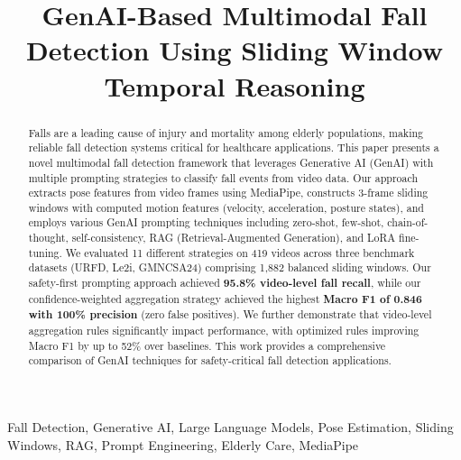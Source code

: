 \documentclass[conference]{IEEEtran}
\begin{document}
\title{GenAI-Based Multimodal Fall Detection Using Sliding Window Temporal Reasoning}

\author{
}

\maketitle

\begin{abstract}
Falls are a leading cause of injury and mortality among elderly populations, making reliable fall detection systems critical for healthcare applications. This paper presents a novel multimodal fall detection framework that leverages Generative AI (GenAI) with multiple prompting strategies to classify fall events from video data. Our approach extracts pose features from video frames using MediaPipe, constructs 3-frame sliding windows with computed motion features (velocity, acceleration, posture states), and employs various GenAI prompting techniques including zero-shot, few-shot, chain-of-thought, self-consistency, RAG (Retrieval-Augmented Generation), and LoRA fine-tuning. We evaluated 11 different strategies on 419 videos across three benchmark datasets (URFD, Le2i, GMNCSA24) comprising 1,882 balanced sliding windows. Our safety-first prompting approach achieved \textbf{95.8\% video-level fall recall}, while our confidence-weighted aggregation strategy achieved the highest \textbf{Macro F1 of 0.846 with 100\% precision} (zero false positives). We further demonstrate that video-level aggregation rules significantly impact performance, with optimized rules improving Macro F1 by up to 52\% over baselines. This work provides a comprehensive comparison of GenAI techniques for safety-critical fall detection applications.
\end{abstract}

\begin{IEEEkeywords}
Fall Detection, Generative AI, Large Language Models, Pose Estimation, Sliding Windows, RAG, Prompt Engineering, Elderly Care, MediaPipe
\end{IEEEkeywords}
\end{document}
